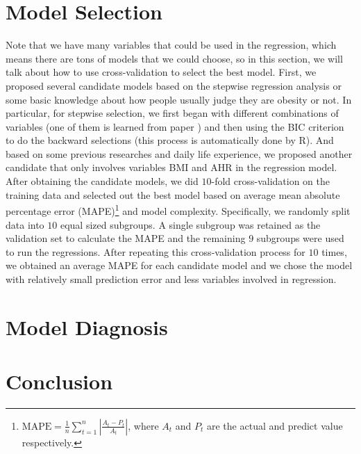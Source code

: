 \documentclass[letterpaper,10pt]{article}
\begin{document}
\section{Model Selection}
Note that we have many variables that could be used in the regression, which means there are tons of models that we could choose, so in this section, we will talk about how to use cross-validation to select the best model. First, we proposed several candidate models based on the stepwise regression analysis or some basic knowledge about how people usually judge they are obesity or not. In particular, for stepwise selection, we first began with different combinations of variables (one of them is learned from paper \cite{development2020Zachary}) and then using the BIC criterion to do the backward selections (this process is automatically done by R). And based on some previous researches and daily life experience, we proposed another candidate that only involves variables BMI and AHR in the regression model. After obtaining the candidate models, we did $10$-fold cross-validation on the training data and selected out the best model based on average mean absolute percentage error (MAPE)\footnote{$\text{MAPE} = \frac{1}{n}\sum_{t=1}^{n}|\frac{A_t - P_t}{A_t}|$, where $A_t$ and $P_t$ are the actual and predict value respectively.} and model complexity. Specifically, we randomly split data into $10$ equal sized subgroups. A single subgroup was retained as the validation set to calculate the MAPE and the remaining $9$ subgroups were used to run the regressions. After repeating this cross-validation process for $10$ times, we obtained an average MAPE for each candidate model and we chose the model with relatively small prediction error and less variables involved in regression.
\section{Model Diagnosis}
\section{Conclusion}





















\end{document}
